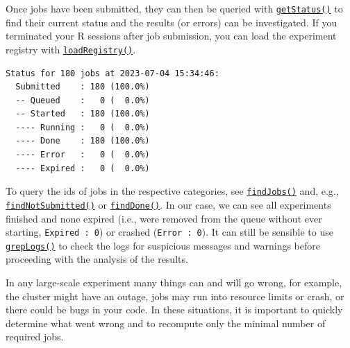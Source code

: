 Once jobs have been submitted, they can then be queried with
\href{https://www.rdocumentation.org/packages/batchtools/topics/getStatus}{\texttt{getStatus()}}
to find their current status and the results (or errors) can be
investigated. If you terminated your R sessions after job submission,
you can load the experiment registry with
\href{https://www.rdocumentation.org/packages/batchtools/topics/loadRegistry}{\texttt{loadRegistry()}}.

\begin{Shaded}
\begin{Highlighting}[]
\NormalTok{(}
\end{Highlighting}
\end{Shaded}

\begin{verbatim}
Status for 180 jobs at 2023-07-04 15:34:46:
  Submitted    : 180 (100.0%)
  -- Queued    :   0 (  0.0%)
  -- Started   : 180 (100.0%)
  ---- Running :   0 (  0.0%)
  ---- Done    : 180 (100.0%)
  ---- Error   :   0 (  0.0%)
  ---- Expired :   0 (  0.0%)
\end{verbatim}

To query the ids of jobs in the respective categories, see
\href{https://www.rdocumentation.org/packages/batchtools/topics/findJobs}{\texttt{findJobs()}}
and, e.g.,
\href{https://www.rdocumentation.org/packages/batchtools/topics/findJobs}{\texttt{findNotSubmitted()}}
or
\href{https://www.rdocumentation.org/packages/batchtools/topics/findJobs}{\texttt{findDone()}}.
In our case, we can see all experiments finished and none expired (i.e.,
were removed from the queue without ever starting,
\texttt{Expired\ :\ 0}) or crashed (\texttt{Error\ :\ 0}). It can still
be sensible to use
\href{https://www.rdocumentation.org/packages/batchtools/topics/grepLogs}{\texttt{grepLogs()}}
to check the logs for suspicious messages and warnings before proceeding
with the analysis of the results.

In any large-scale experiment many things can and will go wrong, for
example, the cluster might have an outage, jobs may run into resource
limits or crash, or there could be bugs in your code. In these
situations, it is important to quickly determine what went wrong and to
recompute only the minimal number of required jobs.

